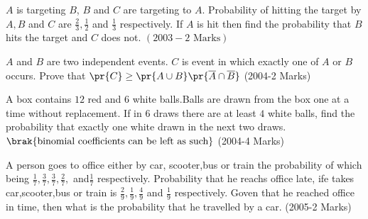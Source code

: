 \iffalse
  \title{Assignment-2}
  \author{EE24BTECH11043-Murra Rajesh Kumar Reddy}
  \section{subjective}
\fi
	\item $A$ is targeting $B$, $B$ and $C$ are targeting to $A$. Probability of hitting the target by $A, B$ and $C$ are $\frac{2}{3},\frac{1}{2}$ and $\frac{1}{3}$ respectively. If $A$ is hit then find the probability that $B$ hits the target and $C$ does not. \hfill${(2003-2 \text{ Marks})}$
	\item $A$ and $B$ are two independent events. $C$ is event in which exactly one of $A$ or $B$ occurs. Prove that $\pr{C}\ge \pr{A\cup B}\pr{\overline{A}\cap\overline{B}}$ \hfill(2004-2 Marks)
	\item A box contains $12$ red and $6$ white balls.Balls are drawn from the box one at a time without replacement. If in 6 draws there are at least $4$ white balls, find the probability that exactly one white drawn in the next two draws. $\brak{\text{binomial coefficients can be left as such}}$ \hfill{(2004-4 Marks)}
\item A person goes to office either by car, scooter,bus or train the probability of which being $\frac{1}{7},\frac{3}{7},\frac{3}{7},\frac{2}{7},$ and$\frac{1}{7}$ respectively. Probability that he reachs office late, ife takes car,scooter,bus or train is $\frac{2}{9},\frac{1}{9},\frac{4}{9}$ and $\frac{1}{9}$ respectively. Goven that he reached office in time, then what is the probability that he travelled by a car. \hfill(2005-2 Marks)



